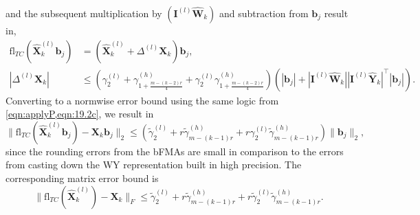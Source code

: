 \documentclass[review,onefignum,onetabnum]{siamart190516}
\newcommand{\bb}[1]{\mathbf{#1}}
\newcommand{\fl}{\mathrm{fl}}
\newcommand{\cO}{\mathcal{O}}
\begin{document}
and the subsequent multiplication by $(\bb{I}^{(l)}\hat{\bb{W}}_k)$ and subtraction from $\bb{b}_j$ result in,
\begin{align*}
\fl_{TC}(\hat{\bb{X}}_{k}^{(l)}\bb{b}_j) &= (\hat{\bb{X}}_{k}^{(l)}+\Delta^{(l)}\bb{X}_k)\bb{b}_j,\\
|\Delta^{(l)}\bb{X}_k| &\leq \left(\gamma_2^{(l)}+\gamma_{1+\frac{m-(k-2)r}{4}}^{(h)}+\gamma_2^{(l)}\gamma_{1+\frac{m-(k-2)r}{4}}^{(h)}\right)\left(|\bb{b}_j|+|\bb{I}^{(l)}\hat{\bb{W}}_k||\bb{I}^{(l)}\hat{\bb{Y}}_k|^{\top}|\bb{b}_j|\right).
\end{align*}
Converting to a normwise error bound using the same logic from \cref{eqn:applyP,eqn:19.2c}, we result in  
\begin{equation}
\|\fl_{TC}(\hat{\bb{X}}_{k}^{(l)}\bb{b}_j)-\bb{X}_k\bb{b}_j\|_2 \leq (\tilde{\gamma}_2^{(l)} +r\tilde{\gamma}_{m-(k-1)r}^{(h)} + r\gamma_2^{(l)}\tilde{\gamma}_{m-(k-1)r}^{(h)}) \|\bb{b}_j\|_2, 
\end{equation}
since the rounding errors from the bFMAs are small in comparison to the errors from casting down the WY representation built in high precision.
The corresponding matrix error bound is
\begin{equation}
\|\fl_{TC}(\hat{\bb{X}}_{k}^{(l)})-\bb{X}_k\|_F \leq \tilde{\gamma}_2^{(l)} +r\tilde{\gamma}_{m-(k-1)r}^{(h)} + r\tilde{\gamma}_2^{(l)}\tilde{\gamma}_{m-(k-1)r}^{(h)}.\label{eqn:mpdeltX}
\end{equation}
\end{document}
